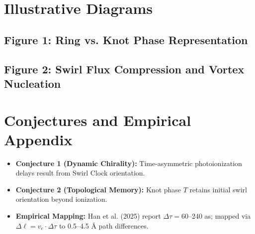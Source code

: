 \documentclass[11pt,a4paper]{article}
\begin{document}
\section{Illustrative Diagrams}

    \subsection*{Figure 1: Ring vs. Knot Phase Representation}
        \begin{center}
        \end{center}

    \subsection*{Figure 2: Swirl Flux Compression and Vortex Nucleation}
        \begin{center}
        \end{center}

\section{Conjectures and Empirical Appendix}

    \begin{itemize}
    \item \textbf{Conjecture 1 (Dynamic Chirality):} Time-asymmetric photoionization delays result from Swirl Clock orientation.
    \item \textbf{Conjecture 2 (Topological Memory):} Knot phase $T$ retains initial swirl orientation beyond ionization.
    \item \textbf{Empirical Mapping:} Han et al. (2025) report $\Delta \tau = 60$–240 as; mapped via $\Delta \ell = v_e \cdot \Delta \tau$ to 0.5–4.5 \AA{} path differences.
    \end{itemize}
\end{document}
